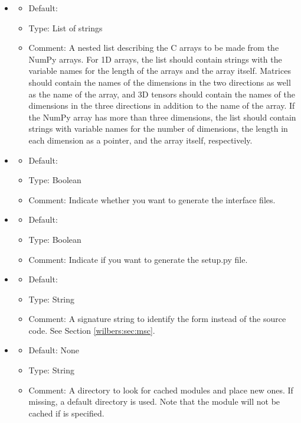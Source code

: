\begin{itemize}
\item {}
  \begin{itemize}
    \item Default: \emp{[]}
    \item Type: List of strings
    \item Comment: A nested list describing the C arrays to be made from the NumPy arrays.
        For 1D arrays, the list should contain strings with the variable names for the length of
        the arrays and the array itself. Matrices should contain the names
        of the dimensions in the two directions as well as the name of the
        array, and 3D tensors should contain the names of the dimensions in
        the three directions in addition to the name of the array.
        If the NumPy array has more than three dimensions, the list should
        contain strings with variable names for the number of dimensions,
        the length in each dimension as a pointer, and the array itself,
        respectively. 
  \end{itemize}
\item {}
  \begin{itemize}
    \item Default: 
    \item Type: Boolean
    \item Comment: Indicate whether you want to generate the interface files.
  \end{itemize}
\item {}
  \begin{itemize}
    \item Default: 
    \item Type: Boolean
    \item Comment: Indicate if you want to generate the setup.py file.
  \end{itemize}
\item {}
  \begin{itemize}
    \item Default: 
    \item Type: String
    \item Comment: A signature string to identify the form instead of the
      source code. See Section \ref{wilbers:sec:msc}.
  \end{itemize}
\item {}
  \begin{itemize}
    \item Default: None
    \item Type: String
    \item Comment: A directory to look for cached modules and place new ones.
      If missing, a default directory is used. Note that the module
      will not be cached if  is specified.
  \end{itemize}
\end{itemize}


